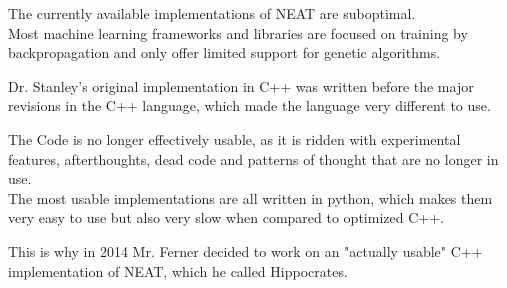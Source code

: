 The currently available implementations of NEAT are suboptimal. \\
Most machine learning frameworks and libraries are focused on training by backpropagation and only offer limited support for genetic algorithms.

Dr. Stanley's original implementation in C++ \cite{Stanley2010} was written before the major revisions in the
C++ language, which made the language very different to use. \cite{Stroustrup2013}

The Code is no longer effectively usable, as it is ridden with experimental features, afterthoughts, dead code and patterns of thought that are no longer in use. \\
The most usable implementations are all written in python, which makes them very easy to use but also very slow when compared to optimized C++.

This is why in 2014 Mr. Ferner decided to work on an "actually usable" C++ implementation of NEAT,
which he called Hippocrates.
